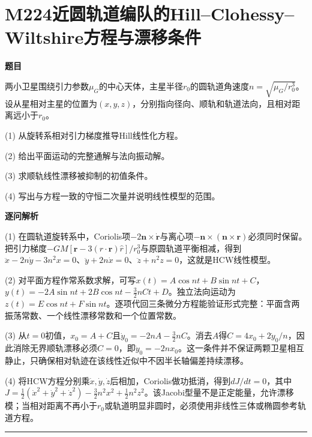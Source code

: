 \documentclass[UTF8,a4paper,11pt,oneside,openany]{ctexbook}
\begin{document}
\section*{M224\quad 近圆轨道编队的Hill–Clohessy–Wiltshire方程与漂移条件}
\textbf{题目}\par
两小卫星围绕引力参数$\mu_G$的中心天体，主星半径$r_0$的圆轨道角速度$n=\sqrt{\mu_G/r_0^3}$。设从星相对主星的位置为$(x,y,z)$，分别指向径向、顺轨和轨道法向，且相对距离远小于$r_0$。
\par\smallskip\noindent (1) 从旋转系相对引力梯度推导Hill线性化方程。
\par\smallskip\noindent (2) 给出平面运动的完整通解与法向振动解。
\par\smallskip\noindent (3) 求顺轨线性漂移被抑制的初值条件。
\par\smallskip\noindent (4) 写出与方程一致的守恒二次量并说明线性模型的范围。
\par\medskip\textbf{逐问解析}\par
\par\smallskip\noindent (1) 在圆轨道旋转系中，Coriolis项$-2\boldsymbol n\times\dot{\boldsymbol r}$与离心项$-\boldsymbol n\times(\boldsymbol n\times\boldsymbol r)$必须同时保留。把引力梯度$-GM[\boldsymbol r-3(\hat r\cdot\boldsymbol r)\hat r]/r_0^3$与原圆轨道平衡相减，得到$\ddot x-2n\dot y-3n^2x=0$、$\ddot y+2n\dot x=0$、$\ddot z+n^2z=0$，这就是HCW线性模型。
\par\smallskip\noindent (2) 对平面方程作常系数求解，可写$x(t)=A\cos nt+B\sin nt+C$，$y(t)=-2A\sin nt+2B\cos nt-\frac32nCt+D$。独立法向运动为$z(t)=E\cos nt+F\sin nt$。逐项代回三条微分方程能验证形式完整：平面含两振荡常数、一个线性漂移常数和一个位置常数。
\par\smallskip\noindent (3) 从$t=0$初值，$x_0=A+C$且$\dot y_0=-2nA-\frac32nC$。消去$A$得$C=4x_0+2\dot y_0/n$，因此消除无界顺轨漂移必须$C=0$，即$\dot y_0=-2nx_0$。这一条件并不保证两颗卫星相互静止，只确保相对轨迹在该线性近似中不因半长轴偏差持续漂移。
\par\smallskip\noindent (4) 将HCW方程分别乘$\dot x,\dot y,\dot z$后相加，Coriolis做功抵消，得到$dJ/dt=0$，其中$J=\frac12(\dot x^2+\dot y^2+\dot z^2)-\frac32n^2x^2+\frac12n^2z^2$。该Jacobi型量不是正定能量，允许漂移模；当相对距离不再小于$r_0$或轨道明显非圆时，必须使用非线性三体或椭圆参考轨道方程。
\par\medskip\hrule\medskip
\end{document}

